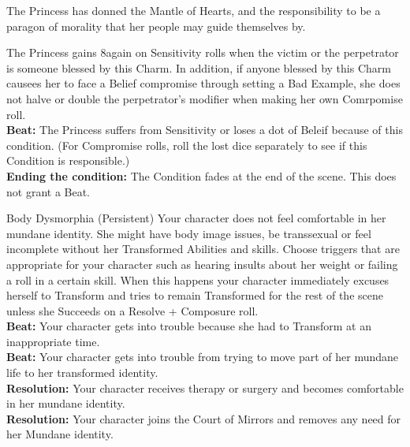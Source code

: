 \documentclass[10pt, frontgrid, backgrid]{flacards}
\begin{document}
{The Princess has donned the Mantle of Hearts, and the responsibility to be a paragon of morality that her people may guide themselves by. 

The Princess gains 8again on Sensitivity rolls when the victim or the perpetrator is someone blessed by this Charm. In addition, if anyone blessed by this Charm causees her to face a Belief compromise through setting a Bad Example, she does not halve or double the perpetrator's modifier when making her own Comrpomise roll.\\

\textbf{Beat:} The Princess suffers from Sensitivity or loses a dot of Beleif because of this condition. (For Compromise rolls, roll the lost dice separately to see if this Condition is responsible.) \\

\textbf{Ending the condition:} The Condition fades at the end of the scene. This does not grant a Beat.}

\Cond
{Body Dysmorphia (Persistent)}
{
Your character does not feel comfortable in her mundane identity. She might have body image issues, be transsexual or feel incomplete without her Transformed Abilities and skills. Choose triggers that are appropriate for your character such as hearing insults about her weight or failing a roll in a certain skill. When this happens your character immediately excuses herself to Transform and tries to remain Transformed for the rest of the scene unless she Succeeds on a Resolve + Composure roll. \\
\textbf{Beat:} Your character gets into trouble because she had to Transform at an inappropriate time. \\
\textbf{Beat:} Your character gets into trouble from trying to move part of her mundane life to her transformed identity. \\
\textbf{Resolution:} Your character receives therapy or surgery and becomes comfortable in her mundane identity. \\
\textbf{Resolution:} Your character joins the Court of Mirrors and removes any need for her Mundane identity. 
}


\end{document}
